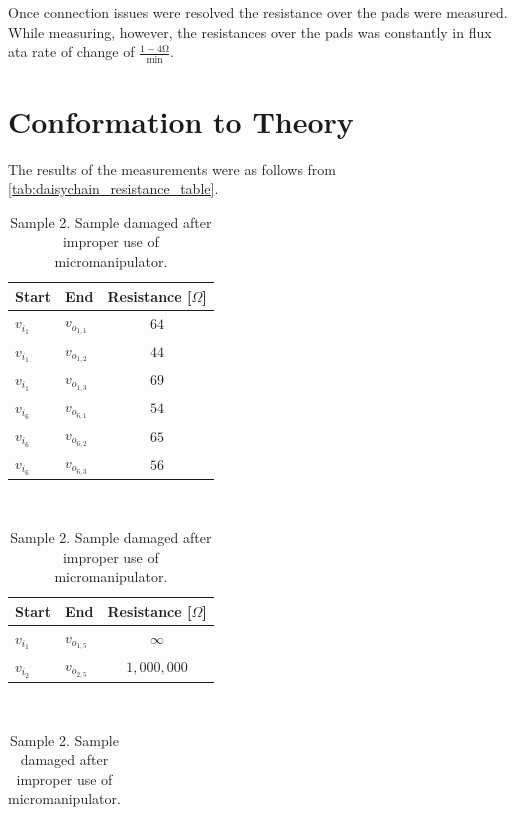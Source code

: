 Once connection issues were resolved the resistance over the pads were measured. While measuring, however, the resistances over the pads was constantly in flux ata rate of change of $\frac{1-4 \unit{\ohm}}{\unit{\minute}}$.

\section{Conformation to Theory}

The results of the measurements were as follows from \ref{tab:daisychain_resistance_table}.

\begin{table}
    \centering
    \begin{subtable}[t]{0.3\textwidth}
        \centering
        \begin{tabular}{| l | l | c |}
            \hline
            Start & End & Resistance [$\Omega$] \\
            \hline
            \hline
            $v_{i_1}$ & $v_{o_{1,1}}$ & $64$ \\
            $v_{i_1}$ & $v_{o_{1,2}}$ & $44$ \\
            $v_{i_1}$ & $v_{o_{1,3}}$ & $69$ \\
            $v_{i_6}$ & $v_{o_{6,1}}$ & $54$ \\
            $v_{i_6}$ & $v_{o_{6,2}}$ & $65$ \\
            $v_{i_6}$ & $v_{o_{6,3}}$ & $56$ \\
            \hline
        \end{tabular}
        \caption{Sample 1.}
    \end{subtable}
    ~
    \begin{subtable}{0.3\textwidth}
        \centering
        \begin{tabular}[t]{| l | l | c |}
            \hline
            Start & End & Resistance [$\Omega$] \\
            \hline
            \hline
            $v_{i_1}$ & $v_{o_{1,5}}$ & $\infty$ \\
            $v_{i_2}$ & $v_{o_{2,5}}$ & $1,000,000$ \\
            \hline
        \end{tabular}
        \caption{Sample 2. Sample damaged after improper use of micromanipulator.}
    \end{subtable}
    ~
    \begin{subtable}[t]{0.3\textwidth}
        \centering
        \begin{tabular}{| l | l | c |}

\end{tabular}
\end{subtable}
\end{table}
